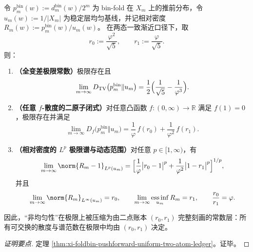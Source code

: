 \begin{conclusion}\label{con:xi-foldbin-pushforward-uniform-two-atom-ledger}
令 \(p_m^{\mathrm{bin}}(w):=d_m^{\mathrm{bin}}(w)/2^m\) 为 bin-fold 在 \(X_m\) 上的推前分布，令 \(u_m(w):=1/|X_m|\) 为稳定层均匀基线，并记相对密度 \(R_m(w):=p_m^{\mathrm{bin}}(w)/u_m(w)\)。
在两态一致渐近口径下，取
\[
r_0:=\frac{\varphi^2}{\sqrt5},\qquad r_1:=\frac{\varphi}{\sqrt5}.
\]
则：
\begin{enumerate}
  \item \textbf{（全变差极限常数）}极限存在且
  \[
  \lim_{m\to\infty}D_{\mathrm{TV}}\bigl(p^{\mathrm{bin}}_m\Vert u_m\bigr)
  =\frac12\Bigl(\frac{1}{\sqrt5}-\frac{1}{\varphi^3}\Bigr).
  \]
  \item \textbf{（任意 \(f\)-散度的二原子闭式）}对任意凸函数 \(f:(0,\infty)\to\mathbb R\) 满足 \(f(1)=0\)，极限存在并满足
  \[
  \lim_{m\to\infty}D_f\bigl(p^{\mathrm{bin}}_m\Vert u_m\bigr)
  =\frac{1}{\varphi}\,f(r_0)+\frac{1}{\varphi^2}\,f(r_1).
  \]
  \item \textbf{（相对密度的 \(L^p\) 极限谱与动态范围）}对任意 \(p\in[1,\infty)\)，有
  \[
  \lim_{m\to\infty}\norm{R_m-1}_{L^p(u_m)}
  =
  \Bigl[\frac{1}{\varphi}\bigl|r_0-1\bigr|^p+\frac{1}{\varphi^2}\bigl|1-r_1\bigr|^p\Bigr]^{1/p},
  \]
  并且
  \[
  \lim_{m\to\infty}\norm{R_m}_{L^\infty(u_m)}=r_0,\qquad
  \lim_{m\to\infty}\operatorname*{ess\,inf}_{u_m}R_m=r_1,
  \qquad
  \frac{r_0}{r_1}=\varphi.
  \]
\end{enumerate}
因此，“非均匀性”在极限上被压缩为由二点账本 \((r_0,r_1)\) 完整刻画的常数层：所有可交换的散度与谱范数在极限中均由 \((r_0,r_1)\) 决定。
\end{conclusion}
\begin{proof}[证明要点]
定理 \ref{thm:xi-foldbin-pushforward-uniform-two-atom-ledger}。证毕。
\end{proof}

